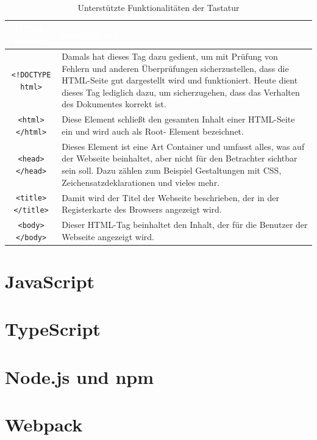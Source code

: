 \begin{table}[H]
	\begin{center}
	\begin{tabular}{| c | m{10cm} |}
		\hline
 		\cellcolor{Gray}\textcolor{White}{HTML-Element} & \cellcolor{Gray}\textcolor{White}{Beschreibung}  \\
		\hline
		\texttt{<!DOCTYPE html>} & Damals hat dieses Tag dazu gedient, um mit Prüfung von Fehlern und anderen 
			Überprüfungen sicherzustellen, dass die HTML-Seite gut dargestellt wird und funktioniert. Heute dient dieses Tag 
			lediglich dazu, um sicherzugehen, dass das Verhalten des Dokumentes korrekt ist.\\
		\hline
		\texttt{<html></html>} & Diese Element schließt den gesamten Inhalt einer HTML-Seite ein und wird auch als Root-
			Element bezeichnet.\\
		\hline
		\texttt{<head></head>} & Dieses Element ist eine Art Container und umfasst alles, was auf der Webseite beinhaltet, 
			aber nicht für den Betrachter sichtbar sein soll. Dazu zählen zum Beispiel Gestaltungen mit CSS, 
			Zeichensatzdeklarationen und vieles mehr.\\
		\hline
		\texttt{<title></title>} & Damit wird der Titel der Webseite beschrieben, der in der Registerkarte des Browsers angezeigt 
			wird.\\
		\hline
		\texttt{<body></body>} & Dieser HTML-Tag beinhaltet den Inhalt, der für die Benutzer der Webseite angezeigt wird. \\
		\hline
	\end{tabular}
	\end{center}
	\caption{Unterstützte Funktionalitäten der Tastatur}
\end{table}



\section{JavaScript}

\section{TypeScript}

\section{Node.js und npm}

\section{Webpack}